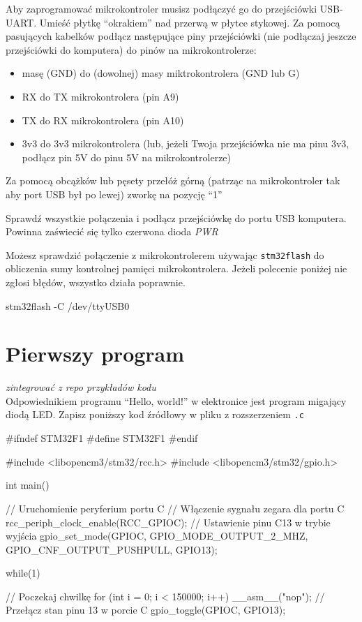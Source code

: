 \documentclass{pdfBooklets}
\begin{document}
Aby zaprogramować mikrokontroler musisz podłączyć go do przejściówki USB-UART. Umieść płytkę ``okrakiem'' nad przerwą
w płytce stykowej. Za pomocą pasujących kabelków podłącz następujące piny przejściówki (nie podłączaj jeszcze
przejściówki do komputera) do pinów na mikrokontrolerze:
\begin{itemize}
\item masę (GND) do (dowolnej) masy miktrokontrolera (GND lub G)
\item RX do TX mikrokontrolera (pin A9)
\item TX do RX mikrokontrolera (pin A10)
\item 3v3 do 3v3 mikrokontrolera (lub, jeżeli Twoja przejściówka nie ma pinu 3v3, podłącz pin 5V do pinu 5V na
  mikrokontrolerze)
\end{itemize}

Za pomocą obcążków lub pęsety przełóż górną (patrząc na mikrokontroler tak aby port USB był po lewej) zworkę na
pozycję ``1''

Sprawdź wszystkie połączenia i podłącz przejściówkę do portu USB komputera. Powinna zaświecić się tylko czerwona dioda
\textit{PWR}

Możesz sprawdzić połączenie z mikrokontrolerem używając \Verb$stm32flash$ do obliczenia sumy kontrolnej pamięci mikrokontrolera.
Jeżeli polecenie poniżej nie zgłosi błędów, wszystko działa poprawnie.

\begin{CodeFrame*}[bash]{}
stm32flash -C /dev/ttyUSB0
\end{CodeFrame*}



\section{Pierwszy program}
\textit{zintegrować z repo przykładów kodu}\\
Odpowiednikiem programu ``Hello, world!'' w elektronice jest program migający diodą LED. Zapisz poniższy kod źródłowy w pliku z
rozszerzeniem \Verb$.c$

\begin{CodeFrame*}[c]{}
#ifndef STM32F1
#define STM32F1
#endif


#include <libopencm3/stm32/rcc.h>
#include <libopencm3/stm32/gpio.h>

int main(){
  // Uruchomienie peryferium portu C
  // Włączenie sygnału zegara dla portu C
  rcc_periph_clock_enable(RCC_GPIOC);
  // Ustawienie pinu C13 w trybie wyjścia
  gpio_set_mode(GPIOC, GPIO_MODE_OUTPUT_2_MHZ,
		GPIO_CNF_OUTPUT_PUSHPULL, GPIO13);

  while(1){
    // Poczekaj chwilkę
    for (int i = 0; i < 150000; i++) __asm__("nop");
    // Przełącz stan pinu 13 w porcie C
    gpio_toggle(GPIOC, GPIO13);
      
  }
}
\end{CodeFrame*}
\end{document}
